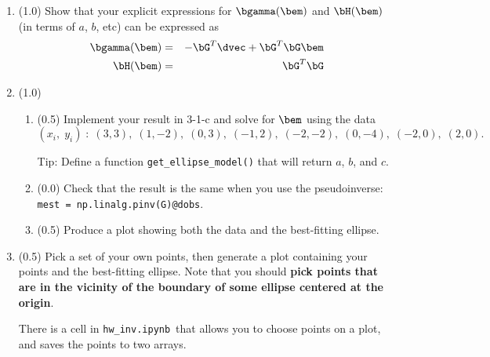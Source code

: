 \documentclass[11pt,titlepage,fleqn]{article}
\newcommand{\tfile}{{\tt hw\_inv.ipynb}}
\begin{document}
\begin{enumerate}

\item (1.0) Show that your explicit expressions for $\bgamma(\bem)$ and $\bH(\bem)$ (in terms of $a$, $b$, etc) can be expressed as
%
\begin{eqnarray}
\bgamma(\bem) &=& -\bG^T\dvec + \bG^T\bG\bem
\\
\bH(\bem) &=& \bG^T\bG
\end{eqnarray}


\item (1.0)
\begin{enumerate}
\item (0.5) Implement your result in 3-1-c and solve for $\bem$ using the data
%
\begin{equation*}
(x_i,\;y_i) \;:\; (3,3),\;(1,-2),\;(0,3),\;(-1,2),\;(-2,-2),\;(0,-4),\;(-2,0),\;(2,0).
\end{equation*}

Tip: Define a function \verb+get_ellipse_model()+ that will return $a$, $b$, and $c$.


\item (0.0) Check that the result is the same when you use the pseudoinverse: \\
\verb+mest = np.linalg.pinv(G)@dobs+.

\item (0.5) Produce a plot showing both the data and the best-fitting ellipse.

\end{enumerate}


\item (0.5) Pick a set of your own points, then generate a plot containing your points and the best-fitting ellipse. Note that you should {\bf pick points that are in the vicinity of the boundary of some ellipse centered at the origin}.

There is a cell in \tfile\ that allows you to choose points on a plot, and saves the points to two arrays.



\end{enumerate}
\end{document}
